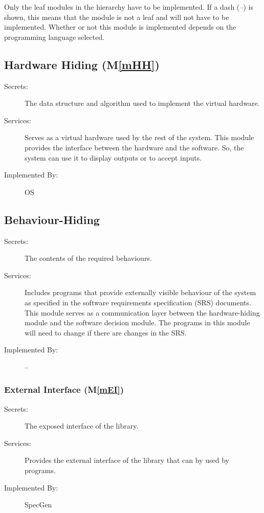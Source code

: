 \documentclass[12pt, titlepage]{article}
\newcommand{\mref}[1]{M\ref{#1}}
\newcommand{\progname}{SpecGen}
\begin{document}
Only the leaf modules in the
hierarchy have to be implemented. If a dash (\emph{--}) is shown, this means
that the module is not a leaf and will not have to be implemented. Whether or
not this module is implemented depends on the programming language
selected.

\subsection{Hardware Hiding (\mref{mHH})}

\begin{description}
\item[Secrets:]The data structure and algorithm used to implement the virtual
  hardware.
\item[Services:]Serves as a virtual hardware used by the rest of the
  system. This module provides the interface between the hardware and the
  software. So, the system can use it to display outputs or to accept inputs.
\item[Implemented By:] OS
\end{description}

\subsection{Behaviour-Hiding}

\begin{description}
\item[Secrets:]The contents of the required behaviours.
\item[Services:]Includes programs that provide externally visible behaviour of
  the system as specified in the software requirements specification (SRS)
  documents. This module serves as a communication layer between the
  hardware-hiding module and the software decision module. The programs in this
  module will need to change if there are changes in the SRS.
\item[Implemented By:] --
\end{description}

\subsubsection{External Interface (\mref{mEI})}

\begin{description}
\item[Secrets:]The exposed interface of the library.
\item[Services:]Provides the external interface of the library that can by used
  by programs.
\item[Implemented By:] \progname{}
\end{description}
\end{document}
